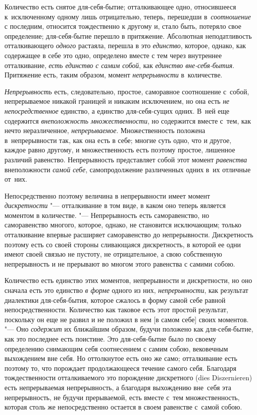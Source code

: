 

Количество есть снятое для-себя-бытие; отталкивающее одно, относившееся
к~исключенному одному лишь отрицательно, теперь, перешедши в~{\em соотношение}
с последним, относится тождественно к другому и, стало быть, потеряло свое
определение; для-себя-бытие перешло в притяжение. Абсолютная неподатливость
отталкивающего {\em одного} растаяла, перешла в это {\em единство}, которое,
однако, как содержащее в себе это одно, определено вместе с тем через
внутреннее отталкивание, {\em есть единство с самим собой}, как
{\em единство вне-себя-бытия}. Притяжение есть, таким образом, момент
{\em непрерывности} в~количестве.

{\em Непрерывность} есть, следовательно, простое, саморавное соотношение
с~собой, непрерываемое никакой границей и никаким исключением, но она есть
{\em не непосредственное} единство, а единство для-себя-сущих одних. В~ней
еще содержится {\em внеположность множественности}, но содержится вместе
с~тем, как нечто неразличенное, {\em непрерываемое}. Множественность положена
в~непрерывности так, как она есть в себе; многие суть одно, что и другое,
каждое равно другому, и множественность есть поэтому простое, лишенное
различий равенство. Непрерывность представляет собой этот момент
{\em равенства} внеположности {\em самой себе}, самопродолжение различенных
одних в~их отличные от~них.

Непосредственно поэтому величина в непрерывности имеет момент
{\em дискретности} "--- отталкивание в том виде, в каком оно теперь является
моментом в количестве. "--- Непрерывность есть саморавенство, но саморавенство
многого, которое, однако, не становится исключающим; только отталкивание
впервые расширяет саморавенство до непрерывности. Дискретность поэтому есть
со своей стороны сливающаяся дискретность, в которой ее одни имеют своей связью
не пустоту, не отрицательное, а свою собственную непрерывность и не прерывают
во многом этого равенства с самими собою.

Количество есть единство этих моментов, непрерывности и дискретности, но оно
сначала есть это единство {\em в форме} одного из них, {\em непрерывности}, как
результат диалектики для-себя-бытия, которое сжалось в форму самой себе равной
непосредственности. Количество как таковое есть этот простой результат,
поскольку он еще не развил и не положил в нем [в самом себе] своих моментов.
"--- Оно {\em содержит} их ближайшим образом, будучи положено как
для-себя-бытие, как это последнее есть поистине. Это для-себя-бытие было по
своему определению снимающим себя соотнесением с самим собою, вековечным
выхождением вне себя. Но оттолкнутое есть оно же само; отталкивание есть
поэтому то, что порождает продолжающееся течение самого себя. Благодаря
тождественности отталкиваемого это порождение дискретного (dies
Dis\-zer\-nie\-ren) есть непрерываемая непрерывность, а благодаря выхождению
вне~себя эта непрерывность, не будучи прерываемой, есть вместе с~тем
множественность, которая столь же непосредственно остается в своем равенстве
с~самой собою.

